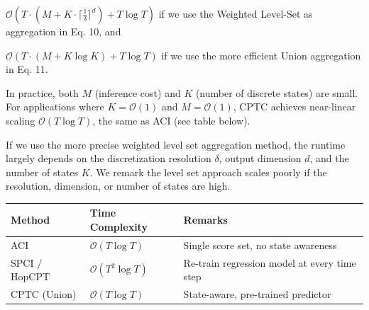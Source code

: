 $\mathcal{O}(T \cdot (M + K \cdot \lceil \frac{1}{\delta} \rceil^d) + T \log T)$ if we use the Weighted Level-Set as aggregation in Eq. 10, and

$\mathcal{O}(T \cdot (M + K \log K) + T \log T)$ if we use the more efficient Union aggregation in Eq. 11.

In practice, both $M$ (inference cost) and $K$ (number of discrete states) are small. For applications where $K = \mathcal{O}(1)$ and $M = \mathcal{O}(1)$, CPTC achieves near-linear scaling $\mathcal{O}(T \log T)$, the same as ACI (see table below).

If we use the more precise weighted level set aggregation method, the runtime largely depends on the discretization resolution $\delta$, output dimension $d$, and the number of states $K$. We remark the level set approach scales poorly if the resolution, dimension, or number of states are high.

\begin{table}[h]
\centering
\begin{tabular}{lll}
\hline
\textbf{Method} & \textbf{Time Complexity} & \textbf{Remarks} \\
\hline
ACI & $\mathcal{O}(T \log T)$ & Single score set, no state awareness \\
SPCI / HopCPT & $\mathcal{O}(T^2 \log T)$ & Re-train regression model at every time step \\
CPTC (Union) & $\mathcal{O}(T \log T)$ & State-aware, pre-trained predictor \\
\hline
\end{tabular}
\end{table}


